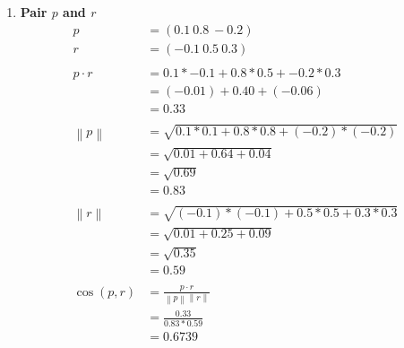 \documentclass[12pt]{article}%
\begin{document}
\begin{enumerate}
\begin{enumerate}
\begin{enumerate}
			\item \textbf{Pair $p$ and $r$}
			\begin{align*}
				 p & = (0.1 \ 0.8 \ -0.2) \\ 
				 r & = (-0.1 \ 0.5 \ 0.3) \\ 
				 \\
				 p \cdot r & = 0.1 * -0.1 + 0.8 * 0.5 + -0.2 * 0.3 \\
				 & = (-0.01) + 0.40 + (-0.06) \\
				 & = 0.33\\ 
				 \\
				 \left \| p \right \| & = \sqrt{0.1 * 0.1 + 0.8 * 0.8 + (-0.2)*(-0.2)} \\
				 & = \sqrt{0.01 + 0.64 + 0.04} \\
				 & = \sqrt{0.69} \\
				 & = 0.83\\
				 \\
				 \left \| r \right \| & = \sqrt{(-0.1) * (-0.1) + 0.5 * 0.5 + 0.3*0.3} \\
				 & = \sqrt{0.01 + 0.25 + 0.09} \\ 
				 & = \sqrt{0.35} \\
				 & = 0.59 \\
				 \\
				 \cos (p,r) & = \frac{p\cdot r}{\left \| p \right \| \left \| r \right \|} \\
				 & = \frac{0.33}{0.83 * 0.59} \\
				 & = 0.6739 \\ %
			\end{align*}


\end{enumerate}
\end{enumerate}
\end{enumerate}
\end{document}
